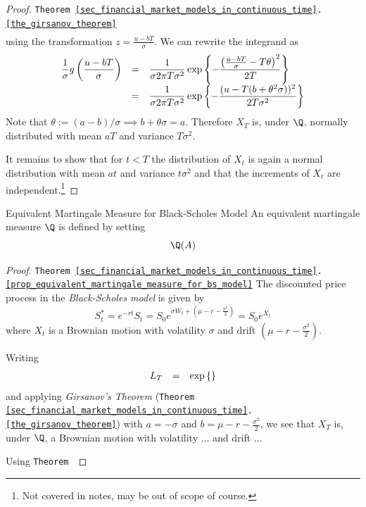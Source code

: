 \documentclass[11pt,a4paper]{article}
\begin{document}
\begin{proof}{\texttt{Theorem \ref{sec_financial_market_models_in_continuous_time}.\ref{the_girsanov_theorem}}}
\[\begin{array}{rcl}
    \end{array}\]
    using the transformation $z=\frac{u-bT}\sigma$.
    We can rewrite the integrand as
    \[\everymath={\displaystyle}\begin{array}{rcl}
      \frac1\sigma g\left(\frac{u-bT}\sigma\right)&=&\frac1{\sigma{2\pi T\sigma^2}}\exp\left\{-\frac{\left(\frac{u-bT}\sigma-T\theta\right)^2}{2T}\right\}\\
      &=&\frac1{\sigma{2\pi T\sigma^2}}\exp\left\{-\frac{(u-T(b+\theta^2\sigma))^2}{2T\sigma^2}\right\}\\
    \end{array}\]
    Note that $\theta:=(a-b)/\sigma\implies b+\theta\sigma=a$. Therefore $X_T$ is, under $\Q$, normally distributed with mean $aT$ and variance $T\sigma^2$.
    \par It remains to show that for $t<T$ the distribution of $X_t$ is again a normal distribution with mean $at$ and variance $t\sigma^2$ and that the increments of $X_t$ are independent.\footnote{Not covered in notes, may be out of scope of course.}\proved
  \end{proof}

  \begin{proposition}{Equivalent Martingale Measure for Black-Scholes Model}\label{prop_equivalent_martingale_measure_for_bs_model}
    An equivalent martingale measure $\Q$ is defined by setting
    \[ \Q(A) \]
  \end{proposition}

  \begin{proof}{\texttt{Theorem \ref{sec_financial_market_models_in_continuous_time}.\ref{prop_equivalent_martingale_measure_for_bs_model}}}
    The discounted price process in the \textit{Black-Scholes model} is given by
    \[ S_t^*=e^{-rt}S_t=S_0e^{\sigma W_t+\left(\mu-r-\frac{\sigma^2}2\right)}=S_0e^{X_t} \]
    where $X_t$ is a Brownian motion with volatility $\sigma$ and drift $\left(\mu-r-\frac{\sigma^2}2\right)$.
    \par Writing
    \[\everymath={\displaystyle}\begin{array}{rcl}
      L_T&=&\exp\left\{\right\}
    \end{array}\]
    and applying \textit{Girsanov's Theorem} (\texttt{Theorem \ref{sec_financial_market_models_in_continuous_time}.\ref{the_girsanov_theorem}}) with $a=-\sigma$ and $b=\mu-r-\frac{\sigma^2}2$, we see that $X_T$ is, under $\Q$, a Brownian motion with volatility ... and drift ...
    \par Using \texttt{Theorem }
  \end{proof}
\end{document}
